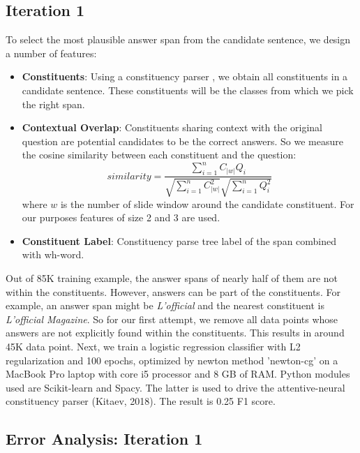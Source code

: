 \subsection{Iteration 1}
To select the most plausible answer span from the candidate sentence, we design a number of features:
\begin{itemize}
\item \textbf{Constituents}: Using a constituency parser \citep{kitaev2018constituency}, we obtain all constituents in a candidate sentence. These constituents will be the classes from which we pick the right span.
\item \textbf{Contextual Overlap}: Constituents sharing context with the original question are potential candidates to be the correct answers. So we measure the cosine similarity between each constituent and the question:
$${ similarity } = \frac { \sum _ { i = 1 } ^ { n } C _ { |w| } Q _ { i } } { \sqrt { \sum _ { i = 1 } ^ { n } C _ { |w| } ^ { 2 } } \sqrt { \sum _ { i = 1 } ^ { n } Q _ { i } ^ { 2 } } }$$ 
where $w$ is the number of slide window around the candidate constituent. For our purposes features of size 2 and 3 are used. 

\item \textbf{Constituent Label}: Constituency parse tree label of the span combined with wh-word.
\end{itemize}
Out of 85K training example, the answer spans of nearly half of them are not within the constituents. However, answers can be part of the constituents.  For example, an answer span might be \textit{L'official} and the nearest constituent is \textit{L'official Magazine}. So for our first attempt, we remove all data points whose answers are not explicitly found within the constituents. This results in around 45K data point. Next, we train a logistic regression classifier with L2 regularization and 100 epochs, optimized by newton method 'newton-cg' on a MacBook Pro laptop with core i5 processor and 8 GB of RAM. Python modules used are Scikit-learn and Spacy. The latter is used to drive the attentive-neural constituency parser (Kitaev, 2018). The result is 0.25 F1 score.




\subsection{Error Analysis: Iteration 1}

